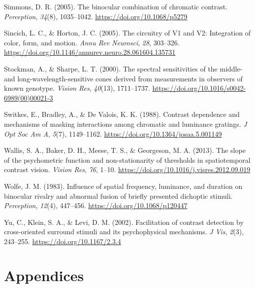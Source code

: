 \documentclass[
  letterpaper,
  DIV=11,
  numbers=noendperiod]{scrartcl}
\newlength{\cslhangindent}
\newenvironment{CSLReferences}[2] %
 {\begin{list}{}{%
  \setlength{\itemindent}{0pt}
  \setlength{\leftmargin}{0pt}
  \setlength{\parsep}{0pt}
  \ifodd #1
   \setlength{\leftmargin}{\cslhangindent}
   \setlength{\itemindent}{-1\cslhangindent}
  \fi
  \setlength{\itemsep}{#2\baselineskip}}}
 {\end{list}}
\begin{document}
\begin{CSLReferences}{1}{0}
Simmons, D. R. (2005). The binocular combination of chromatic contrast.
\emph{Perception}, \emph{34}(8), 1035--1042.
\url{https://doi.org/10.1068/p5279}

Sincich, L. C., \& Horton, J. C. (2005). The circuitry of V1 and V2:
Integration of color, form, and motion. \emph{Annu Rev Neurosci},
\emph{28}, 303--326.
\url{https://doi.org/10.1146/annurev.neuro.28.061604.135731}

Stockman, A., \& Sharpe, L. T. (2000). The spectral sensitivities of the
middle- and long-wavelength-sensitive cones derived from measurements in
observers of known genotype. \emph{Vision Res}, \emph{40}(13),
1711--1737. \url{https://doi.org/10.1016/s0042-6989(00)00021-3}

Switkes, E., Bradley, A., \& De Valois, K. K. (1988). Contrast
dependence and mechanisms of masking interactions among chromatic and
luminance gratings. \emph{J Opt Soc Am A}, \emph{5}(7), 1149--1162.
\url{https://doi.org/10.1364/josaa.5.001149}

Wallis, S. A., Baker, D. H., Meese, T. S., \& Georgeson, M. A. (2013).
The slope of the psychometric function and non-stationarity of
thresholds in spatiotemporal contrast vision. \emph{Vision Res},
\emph{76}, 1--10. \url{https://doi.org/10.1016/j.visres.2012.09.019}

Wolfe, J. M. (1983). Influence of spatial frequency, luminance, and
duration on binocular rivalry and abnormal fusion of briefly presented
dichoptic stimuli. \emph{Perception}, \emph{12}(4), 447--456.
\url{https://doi.org/10.1068/p120447}

Yu, C., Klein, S. A., \& Levi, D. M. (2002). Facilitation of contrast
detection by cross-oriented surround stimuli and its psychophysical
mechanisms. \emph{J Vis}, \emph{2}(3), 243--255.
\url{https://doi.org/10.1167/2.3.4}

\end{CSLReferences}

\section{Appendices}\label{appendices}

\beginsupplement
\end{document}
